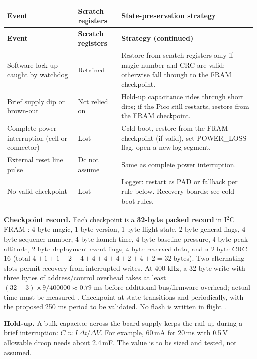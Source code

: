\small
{}
\begin{longtable}{@{}L{35mm}L{36mm}L{70mm}@{}}
\toprule{}\textbf{Event}&\textbf{Scratch registers}&\textbf{State-preservation strategy}\\\midrule\endfirsthead
\toprule{}\textbf{Event}&\textbf{Scratch registers}&\textbf{Strategy (continued)}\\\midrule\endhead
\bottomrule\endlastfoot
Software lock-up caught by watchdog & Retained \cite{rp2040ds} & Restore from scratch registers only if magic number and CRC are valid; otherwise fall through to the FRAM checkpoint.\\
Brief supply dip or brown-out & Not relied on & Hold-up capacitance rides through short dips; if the Pico still restarts, restore from the FRAM checkpoint.\\
Complete power interruption (cell or connector) & Lost & Cold boot, restore from the FRAM checkpoint (if valid), set POWER\_LOSS flag, open a new log segment.\\
External reset line pulse & Do not assume & Same as complete power interruption.\\
No valid checkpoint & Lost & Logger: restart as PAD or fallback per rule below. Recovery boards: see cold-boot rules.\\
\end{longtable}
\normalsize

\textbf{Checkpoint record.} Each checkpoint is a \textbf{32-byte packed record} in I$^2$C FRAM \cite{fram}: 4-byte magic, 1-byte version, 1-byte flight state, 2-byte general flags, 4-byte sequence number, 4-byte launch time, 4-byte baseline pressure, 4-byte peak altitude, 2-byte deployment event flags, 4-byte reserved data, and a 2-byte CRC-16 (total $4+1+1+2+4+4+4+4+2+4+2=32$ bytes). Two alternating slots permit recovery from interrupted writes. At 400 kHz, a 32-byte write with three bytes of address/control overhead takes at least $(32+3)\times9/400000\approx0.79$ ms before additional bus/firmware overhead; actual time must be measured \cite{i2cspec}. Checkpoint at state transitions and periodically, with the proposed 250 ms period to be validated. No flash is written in flight \cite{rp2040ds}.

\textbf{Hold-up.} A bulk capacitor across the board supply keeps the rail up during a brief interruption: $C\approx I\,\Delta t/\Delta V$. For example, 60\,mA for 20\,ms with 0.5\,V allowable droop needs about 2.4\,mF. The value is to be sized and tested, not assumed.

